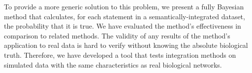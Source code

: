 \documentclass{bioinfo}
\newcommand{\note}[1]{{\color{red}[#1]}}
\newcommand{\REF}{{\color{red}[REF]}}
\begin{document}


To provide a more generic solution to this problem, we present a fully Bayesian method that calculates, for each statement in a semantically-integrated dataset, the probability that it is true. We have evaluated the method's effectiveness in comparison to related methods. The validity of any results of the method's application to real data is hard to verify without knowing the absolute biological truth. Therefore, we have developed a tool that tests integration methods on simulated data with the same characteristics as real biological networks.
\end{document}
